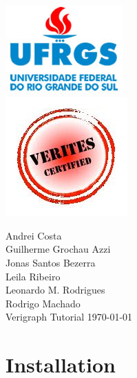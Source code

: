 \documentclass[12pt]{article}
\begin{document}
\begin{titlepage}

\center {\today}\\[2cm]

\includegraphics[scale = 3]{logo.jpg}\\[0.5cm]
\includegraphics[scale = 0.7]{LogoVerites.jpg}

 

\begin{titlepage}
\vfill
\begin{flushleft} 
{\large Andrei Costa \\
Guilherme Grochau Azzi \\
Jonas Santos Bezerra \\
Leila Ribeiro \\
Leonardo M. Rodrigues \\
Rodrigo Machado } \\ [5cm] 
{\Huge Verigraph Tutorial}
\vfill
\today
\end{flushleft}
\end{titlepage}

\vfill %

\end{titlepage}

\section{Installation}
\end{document}

